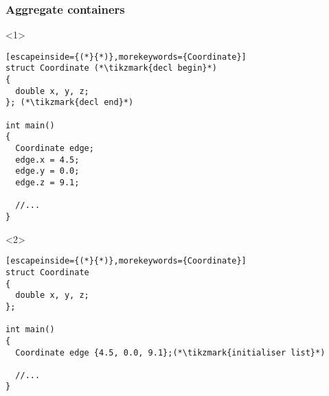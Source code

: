 \documentclass[14pt,a4paper,dvipsnames,usenames]{beamer}
\begin{document}
\begin{frame}[fragile]
  \frametitle{Aggregate containers}
  \begin{overlayarea}{\textwidth}{7cm}
  \begin{onlyenv}<1>
  \begin{lstlisting}[escapeinside={(*}{*)},morekeywords={Coordinate}]
struct Coordinate (*\tikzmark{decl begin}*)
{
  double x, y, z;
}; (*\tikzmark{decl end}*)

int main()
{
  Coordinate edge;
  edge.x = 4.5;
  edge.y = 0.0;
  edge.z = 9.1;

  //...
}
  \end{lstlisting}
  \end{onlyenv}

  \begin{onlyenv}<2>
  \begin{lstlisting}[escapeinside={(*}{*)},morekeywords={Coordinate}]
struct Coordinate
{
  double x, y, z;
};

int main()
{
  Coordinate edge {4.5, 0.0, 9.1};(*\tikzmark{initialiser list}*)

  //...
}
  \end{lstlisting}
  \end{onlyenv}
  \end{overlayarea}

  \nointerlineskip
  
\end{frame}
\end{document}
